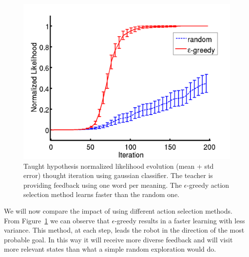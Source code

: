\begin{figure}[!htbp]
	\centering
		\includegraphics[width=\ww\columnwidth]{images/results/feedback}
	\caption{Taught hypothesis normalized likelihood evolution (mean + std error) thought iteration using gaussian classifier. The teacher is providing feedback using one word per meaning. The $\epsilon$-greedy action selection method learns faster than the random one. }
	\label{fig:FeedbackGaussianRdmGreed}
\end{figure}

We will now compare the impact of using different action selection methods. From Figure~\ref{fig:FeedbackGaussianRdmGreed} we can observe that $\epsilon$-greedy results in a faster learning with less variance. This method, at each step, leads the robot in the direction of the most probable goal.
In this way it will receive more diverse feedback and will visit more relevant states than what a simple random exploration would do.
%
